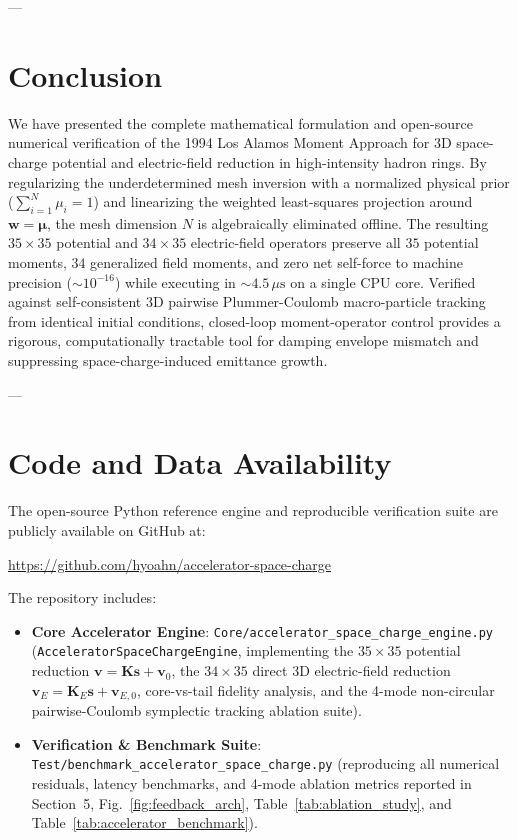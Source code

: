 \documentclass[11pt,a4paper]{article}
\begin{document}
---

\section{Conclusion}
We have presented the complete mathematical formulation and open-source numerical verification of the 1994 Los Alamos Moment Approach for 3D space-charge potential and electric-field reduction in high-intensity hadron rings. By regularizing the underdetermined mesh inversion with a normalized physical prior ($\sum_{i=1}^N \mu_i = 1$) and linearizing the weighted least-squares projection around $\bm{w} = \bm{\mu}$, the mesh dimension $N$ is algebraically eliminated offline. The resulting $35 \times 35$ potential and $34 \times 35$ electric-field operators preserve all $35$ potential moments, $34$ generalized field moments, and zero net self-force to machine precision ($\sim 10^{-16}$) while executing in $\sim 4.5\,\mu\mathrm{s}$ on a single CPU core. Verified against self-consistent 3D pairwise Plummer-Coulomb macro-particle tracking from identical initial conditions, closed-loop moment-operator control provides a rigorous, computationally tractable tool for damping envelope mismatch and suppressing space-charge-induced emittance growth.

---

\section*{Code and Data Availability}
The open-source Python reference engine and reproducible verification suite are publicly available on GitHub at:
\begin{center}
    \url{https://github.com/hyoahn/accelerator-space-charge}
\end{center}
The repository includes:
{\sloppy
\begin{itemize}
    \item \textbf{Core Accelerator Engine}: \texttt{Core/\allowbreak accelerator\_\allowbreak space\_\allowbreak charge\_\allowbreak engine.py} (\texttt{Accelerator\allowbreak Space\allowbreak Charge\allowbreak Engine}, implementing the $35 \times 35$ potential reduction $\bm{v} = \bm{K}\bm{s} + \bm{v}_0$, the $34 \times 35$ direct 3D electric-field reduction $\bm{v}_E = \bm{K}_E\bm{s} + \bm{v}_{E,0}$, core-vs-tail fidelity analysis, and the 4-mode non-circular pairwise-Coulomb symplectic tracking ablation suite).
    \item \textbf{Verification \& Benchmark Suite}: \texttt{Test/\allowbreak benchmark\_\allowbreak accelerator\_\allowbreak space\_\allowbreak charge.py} (reproducing all numerical residuals, latency benchmarks, and 4-mode ablation metrics reported in Section~5, Fig.~\ref{fig:feedback_arch}, Table~\ref{tab:ablation_study}, and Table~\ref{tab:accelerator_benchmark}).
\end{itemize}
}
\end{document}
